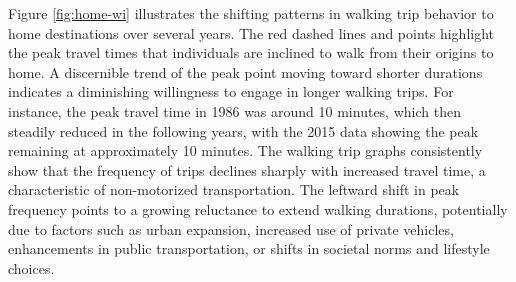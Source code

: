 \documentclass[12pt,twoside]{reedthesis}
\begin{document}
Figure \ref{fig:home-wi} illustrates the shifting patterns in walking trip behavior to home destinations over several years. The red dashed lines and points highlight the peak travel times that individuals are inclined to walk from their origins to home. A discernible trend of the peak point moving toward shorter durations indicates a diminishing willingness to engage in longer walking trips. For instance, the peak travel time in 1986 was around 10 minutes, which then steadily reduced in the following years, with the 2015 data showing the peak remaining at approximately 10 minutes. The walking trip graphs consistently show that the frequency of trips declines sharply with increased travel time, a characteristic of non-motorized transportation. The leftward shift in peak frequency points to a growing reluctance to extend walking durations, potentially due to factors such as urban expansion, increased use of private vehicles, enhancements in public transportation, or shifts in societal norms and lifestyle choices.
\end{document}
